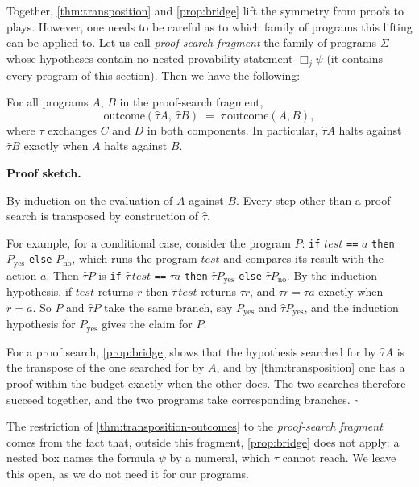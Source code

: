 \documentclass[twoside,11pt]{article}
\renewcommand{\BlackBox}{\ensuremath{\square}}
\renewenvironment{proof}[1][Proof]{%
  \par\noindent\textbf{#1.}\enspace\ignorespaces
}{%
  \ifhmode\unskip\nobreak\hfill\quad\else\noindent\hfill\fi
  \BlackBox\par\addvspace{2mm}%
}
\begin{document}
Together, \cref{thm:transposition} and \cref{prop:bridge} lift the symmetry from proofs to plays. However, one needs to be careful as to which family of programs this lifting can be applied to. Let us call \emph{proof-search fragment} the family of programs $\Sigma$ whose hypotheses contain no nested provability statement $\Box_j\psi$ (it contains every program of this section). Then we have the following: 

\begin{theorem}\label{thm:transposition-outcomes}
For all programs $A$, $B$ in the proof-search fragment,
\[
  \mathrm{outcome}(\hat\tau A,\ \hat\tau B) \;=\; \tau\,\mathrm{outcome}(A, B),
\]
where $\tau$ exchanges $C$ and $D$ in both components. In particular, $\hat\tau A$ halts against $\hat\tau B$ exactly when $A$ halts against $B$.
\end{theorem}
\begin{proof}[Proof sketch]
By induction on the evaluation of $A$ against $B$. Every step other than a proof search is transposed by construction of $\hat\tau$. 

For example, for a conditional case, consider the program $P$: \texttt{if} $\mathit{test}$ \texttt{==} $a$ \texttt{then} $P_{\mathrm{yes}}$ \texttt{else} $P_{\mathrm{no}}$, which runs the program $\mathit{test}$ and compares its result with the action $a$. Then $\hat\tau P$ is \texttt{if} $\hat\tau\,\mathit{test}$ \texttt{==} $\tau a$ \texttt{then} $\hat\tau P_{\mathrm{yes}}$ \texttt{else} $\hat\tau P_{\mathrm{no}}$. By the induction hypothesis, if $\mathit{test}$ returns $r$ then $\hat\tau\,\mathit{test}$ returns $\tau r$, and $\tau r = \tau a$ exactly when $r = a$. So $P$ and $\hat\tau P$ take the same branch, say $P_{\mathrm{yes}}$ and $\hat\tau P_{\mathrm{yes}}$, and the induction hypothesis for $P_{\mathrm{yes}}$ gives the claim for $P$.

For a proof search, \cref{prop:bridge} shows that the hypothesis searched for by $\hat\tau A$ is the transpose of the one searched for by $A$, and by \cref{thm:transposition} one has a proof within the budget exactly when the other does. The two searches therefore succeed together, and the two programs take corresponding branches.
\end{proof}

The restriction of \cref{thm:transposition-outcomes} to the \textit{proof-search fragment} comes from the fact that, outside this fragment, \cref{prop:bridge} does not apply: a nested box names the formula $\psi$ by a numeral, which $\tau$ cannot reach. We leave this open, as we do not need it for our programs.
\end{document}
